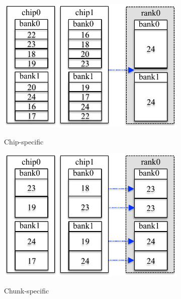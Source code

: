 \begin{figure}
 \centering
  \begin{subfigure}{.35\textwidth}
    \centering
    	\includegraphics[width=\linewidth]{figures/default.pdf}\\
    \caption{Chip-specific}
    \label{fig:chip_default}
  \end{subfigure}
%
  \begin{subfigure}{.35\textwidth}
    \centering
    	\includegraphics[width=\linewidth]{figures/chunk_unsort.pdf}\\
    \caption{Chunk-specific}
    \label{fig:chunk_unsort}
  \end{subfigure}
  \begin{subfigure}{.35\textwidth}
    \centering

\end{subfigure}
\end{figure}
